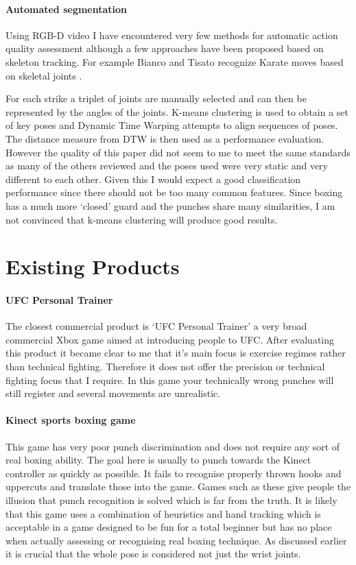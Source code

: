  \paragraph{Automated segmentation}
 Using RGB-D video I have encountered very few methods for automatic action quality assessment although a few approaches have been proposed based on skeleton tracking. 
For example Bianco and Tisato recognize Karate moves based on skeletal joints \cite{karate}.

For each strike a triplet of joints are manually selected and can then be represented by the angles of the joints. K-means clustering is used to obtain a set of key poses and Dynamic Time Warping attempts to align sequences of poses. The distance measure from DTW is then used as a performance evaluation. However the quality of this paper did not seem to me to meet the same standards as many of the others reviewed and the poses used were very static and very different to each other.
Given this I would expect a good classification performance since there should not be too many common features. Since boxing has a much more `closed' guard and the punches share many similarities, I am not convinced that k-means clustering will produce good results.


\section{Existing Products}
\paragraph{UFC Personal Trainer}
The closest commercial product is `UFC Personal Trainer' a very broad commercial Xbox game aimed at introducing people to UFC. After evaluating this product it became clear to me that it’s main focus is  exercise regimes rather than technical fighting. Therefore it does not offer the precision or technical fighting focus that I require. In this game your technically wrong punches will still register and several movements are unrealistic.

\paragraph{Kinect sports boxing game}
This game has very poor punch discrimination and does not require any sort of real boxing ability. The goal here is usually to punch towards the Kinect controller as quickly as possible. It fails to recognise properly thrown hooks and uppercuts and translate those into the game. 
Games such as these give people the illusion that punch recognition is solved which is far from the truth. It is likely that this game uses a combination of heuristics and hand tracking which is acceptable in a game designed to be fun for a total beginner but has no place when actually assessing or recognising real boxing technique. As discussed earlier it is crucial that the whole pose is considered not just the wrist joints.

